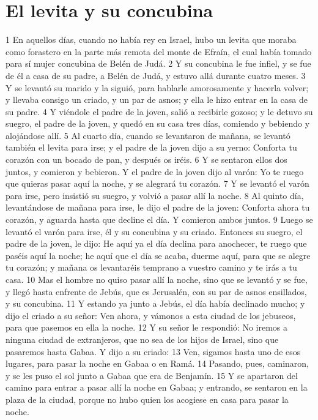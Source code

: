 \section*{El levita y su concubina}

1 En aquellos días, cuando no había rey en Israel, hubo un levita que moraba como forastero en la parte más remota del monte de Efraín, el cual había tomado para sí mujer concubina de Belén de Judá.
2 Y su concubina le fue infiel, y se fue de él a casa de su padre, a Belén de Judá, y estuvo allá durante cuatro meses. 
3 Y se levantó su marido y la siguió, para hablarle amorosamente y hacerla volver; y llevaba consigo un criado, y un par de asnos; y ella le hizo entrar en la casa de su padre.
4 Y viéndole el padre de la joven, salió a recibirle gozoso; y le detuvo su suegro, el padre de la joven, y quedó en su casa tres días, comiendo y bebiendo y alojándose allí.
5 Al cuarto día, cuando se levantaron de mañana, se levantó también el levita para irse; y el padre de la joven dijo a su yerno: Conforta tu corazón con un bocado de pan, y después os iréis.
6 Y se sentaron ellos dos juntos, y comieron y bebieron. Y el padre de la joven dijo al varón: Yo te ruego que quieras pasar aquí la noche, y se alegrará tu corazón.
7 Y se levantó el varón para irse, pero insistió su suegro, y volvió a pasar allí la noche.
8 Al quinto día, levantándose de mañana para irse, le dijo el padre de la joven: Conforta ahora tu corazón, y aguarda hasta que decline el día. Y comieron ambos juntos.
9 Luego se levantó el varón para irse, él y su concubina y su criado. Entonces su suegro, el padre de la joven, le dijo: He aquí ya el día declina para anochecer, te ruego que paséis aquí la noche; he aquí que el día se acaba, duerme aquí, para que se alegre tu corazón; y mañana os levantaréis temprano a vuestro camino y te irás a tu casa.
10 Mas el hombre no quiso pasar allí la noche, sino que se levantó y se fue, y llegó hasta enfrente de Jebús, que es Jerusalén, con su par de asnos ensillados, y su concubina.
11 Y estando ya junto a Jebús, el día había declinado mucho; y dijo el criado a su señor: Ven ahora, y vámonos a esta ciudad de los jebuseos, para que pasemos en ella la noche.
12 Y su señor le respondió: No iremos a ninguna ciudad de extranjeros, que no sea de los hijos de Israel, sino que pasaremos hasta Gabaa. Y dijo a su criado:
13 Ven, sigamos hasta uno de esos lugares, para pasar la noche en Gabaa o en Ramá.
14 Pasando, pues, caminaron, y se les puso el sol junto a Gabaa que era de Benjamín.
15 Y se apartaron del camino para entrar a pasar allí la noche en Gabaa; y entrando, se sentaron en la plaza de la ciudad, porque no hubo quien los acogiese en casa para pasar la noche.
